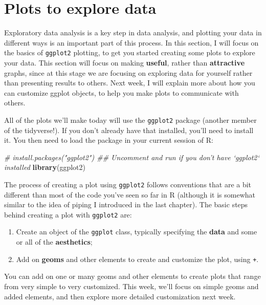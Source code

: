 \documentclass[]{book}
\makeatletter
\newenvironment{Shaded}{\begin{snugshade}}{\end{snugshade}}
\newcommand{\KeywordTok}[1]{\textcolor[rgb]{0.13,0.29,0.53}{\textbf{{#1}}}}
\newcommand{\CommentTok}[1]{\textcolor[rgb]{0.56,0.35,0.01}{\textit{{#1}}}}
\newcommand{\NormalTok}[1]{{#1}}
\providecommand{\tightlist}{%
  \setlength{\itemsep}{0pt}\setlength{\parskip}{0pt}}
\newenvironment{kframe}{%
\medskip{}
\setlength{\fboxsep}{.8em}
 \def\at@end@of@kframe{}%
 \ifinner\ifhmode%
  \def\at@end@of@kframe{\end{minipage}}%
  \begin{minipage}{\columnwidth}%
 \fi\fi%
 \def\FrameCommand##1{\hskip\@totalleftmargin \hskip-\fboxsep
 \colorbox{shadecolor}{##1}\hskip-\fboxsep
     \hskip-\linewidth \hskip-\@totalleftmargin \hskip\columnwidth}%
 \MakeFramed {\advance\hsize-\width
   \@totalleftmargin\z@ \linewidth\hsize
   \@setminipage}}%
 {\par\unskip\endMakeFramed%
 \at@end@of@kframe}
\renewenvironment{Shaded}{\begin{kframe}}{\end{kframe}}
\makeatother
\begin{document}
\section{Plots to explore data}\label{plots-to-explore-data}

Exploratory data analysis is a key step in data analysis, and plotting
your data in different ways is an important part of this process. In
this section, I will focus on the basics of \texttt{ggplot2} plotting,
to get you started creating some plots to explore your data. This
section will focus on making \textbf{useful}, rather than
\textbf{attractive} graphs, since at this stage we are focusing on
exploring data for yourself rather than presenting results to others.
Next week, I will explain more about how you can customize ggplot
objects, to help you make plots to communicate with others.

All of the plots we'll make today will use the \texttt{ggplot2} package
(another member of the tidyverse!). If you don't already have that
installed, you'll need to install it. You then need to load the package
in your current session of R:

\begin{Shaded}
\begin{Highlighting}[]
\CommentTok{# install.packages("ggplot2")  ## Uncomment and run if you don't have `ggplot2` installed}
\KeywordTok{library}\NormalTok{(ggplot2)}
\end{Highlighting}
\end{Shaded}

The process of creating a plot using \texttt{ggplot2} follows
conventions that are a bit different than most of the code you've seen
so far in R (although it is somewhat similar to the idea of piping I
introduced in the last chapter). The basic steps behind creating a plot
with \texttt{ggplot2} are:

\begin{enumerate}
\def\labelenumi{\arabic{enumi}.}
\tightlist
\item
  Create an object of the \texttt{ggplot} class, typically specifying
  the \textbf{data} and some or all of the \textbf{aesthetics};
\item
  Add on \textbf{geoms} and other elements to create and customize the
  plot, using \texttt{+}.
\end{enumerate}

You can add on one or many geoms and other elements to create plots that
range from very simple to very customized. This week, we'll focus on
simple geoms and added elements, and then explore more detailed
customization next week.
\end{document}
